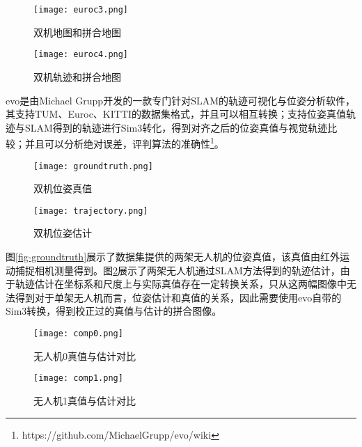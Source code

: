 \begin{figure}[htbp]
	\centering
	\begin{minipage}[t]{0.45\columnwidth} %
		\centering
		\texttt{[image: euroc3.png]}
		\caption{双机地图和拼合地图}
		\label{fig-euroc3}
	\end{minipage}
	\begin{minipage}[t]{0.45\columnwidth}
		\centering
		\texttt{[image: euroc4.png]}
		\caption{双机轨迹和拼合地图}
		\label{fig-euroc4}
	\end{minipage}
\end{figure}

evo是由Michael Grupp开发的一款专门针对SLAM的轨迹可视化与位姿分析软件，其支持TUM、Euroc、KITTI的数据集格式，并且可以相互转换；支持位姿真值轨迹与SLAM得到的轨迹进行Sim3转化，得到对齐之后的位姿真值与视觉轨迹比较；并且可以分析绝对误差，评判算法的准确性\footnote[1]{https://github.com/MichaelGrupp/evo/wiki}。

\begin{figure}[htbp]
	\centering
	\begin{minipage}[t]{0.45\columnwidth} %
		\centering
		\texttt{[image: groundtruth.png]}
		\caption{双机位姿真值}
		\label{fig-groundtruth}
	\end{minipage}
	\begin{minipage}[t]{0.45\columnwidth}
		\centering
		\texttt{[image: trajectory.png]}
		\caption{双机位姿估计}
		\label{fig-trajectory}
	\end{minipage}
\end{figure}

图\ref{fig-groundtruth}展示了数据集提供的两架无人机的位姿真值，该真值由红外运动捕捉相机测量得到。图\ref{fig-trajectory}展示了两架无人机通过SLAM方法得到的轨迹估计，由于轨迹估计在坐标系和尺度上与实际真值存在一定转换关系，只从这两幅图像中无法得到对于单架无人机而言，位姿估计和真值的关系，因此需要使用evo自带的Sim3转换，得到校正过的真值与估计的拼合图像。

\begin{figure}[htbp]
	\centering
	\begin{minipage}[t]{0.45\columnwidth} %
		\centering
		\texttt{[image: comp0.png]}
		\caption{无人机0真值与估计对比}
		\label{fig-comp0}
	\end{minipage}
	\begin{minipage}[t]{0.45\columnwidth}
		\centering
		\texttt{[image: comp1.png]}
		\caption{无人机1真值与估计对比}
		\label{fig-comp1}
	\end{minipage}
\end{figure}

